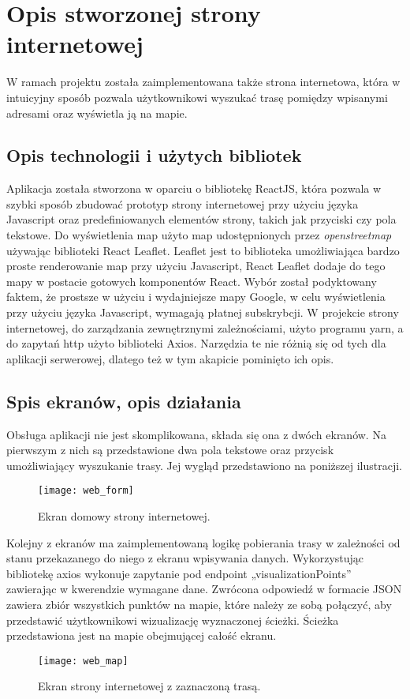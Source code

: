 \section{Opis stworzonej strony internetowej}

W ramach projektu została zaimplementowana także strona internetowa, która w intuicyjny sposób pozwala użytkownikowi wyszukać trasę pomiędzy wpisanymi adresami oraz wyświetla ją na mapie. 

\subsection{Opis technologii i użytych bibliotek}

Aplikacja została stworzona w oparciu o bibliotekę ReactJS, która pozwala w szybki sposób zbudować prototyp strony internetowej przy użyciu języka Javascript oraz predefiniowanych elementów strony, takich jak przyciski czy pola tekstowe. Do wyświetlenia map użyto map udostępnionych przez \textit{openstreetmap} używając biblioteki React Leaflet. Leaflet jest to biblioteka umożliwiająca bardzo proste renderowanie map przy użyciu Javascript, React Leaflet dodaje do tego mapy w postacie gotowych komponentów React. Wybór został podyktowany faktem, że prostsze w użyciu i wydajniejsze mapy Google, w celu wyświetlenia przy użyciu języka Javascript, wymagają płatnej subskrybcji.
W projekcie strony internetowej, do zarządzania zewnętrznymi zależnościami, użyto programu yarn, a do zapytań http użyto biblioteki Axios. Narzędzia te nie różnią się od tych dla aplikacji serwerowej, dlatego też w tym akapicie pominięto ich opis.

\subsection{Spis ekranów, opis działania}

Obsługa aplikacji nie jest skomplikowana, składa się ona z dwóch ekranów. Na pierwszym z nich są przedstawione dwa pola tekstowe oraz przycisk umożliwiający wyszukanie trasy. Jej wygląd przedstawiono na poniższej ilustracji.

\begin{figure}[H]
\centering
\texttt{[image: web\_form]}
\caption{Ekran domowy strony internetowej.}
\end{figure}

Kolejny z ekranów ma zaimplementowaną logikę pobierania trasy w zależności od stanu przekazanego do niego z ekranu wpisywania danych. Wykorzystując bibliotekę axios wykonuje zapytanie pod endpoint „visualizationPoints” zawierając w kwerendzie wymagane dane. Zwrócona odpowiedź w formacie JSON zawiera zbiór wszystkich punktów na mapie, które należy ze sobą połączyć, aby przedstawić użytkownikowi wizualizację wyznaczonej ścieżki. Ścieżka przedstawiona jest na mapie obejmującej całość ekranu.

\begin{figure}[H]
\centering
\texttt{[image: web\_map]}
\caption{Ekran strony internetowej z zaznaczoną trasą.}
\end{figure}

